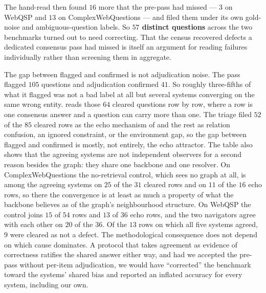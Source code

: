 The hand-read then found $16$ more that the pre-pass had missed --- $3$
on WebQSP and $13$ on ComplexWebQuestions --- and filed them under its
own gold-noise and ambiguous-question labels. So \textbf{$57$ distinct
questions} across the two benchmarks turned out to need correcting. That
the census recovered defects a dedicated consensus pass had missed is
itself an argument for reading failures individually rather than
screening them in aggregate.

The gap between flagged and confirmed is not adjudication noise. The
pass flagged $105$ questions and adjudication confirmed $41$. So roughly
three-fifths of what it flagged was not a bad label at all but several
systems converging on the same wrong entity.  reads
those $64$ cleared questions row by row, where a row is one consensus
answer and a question can carry more than one. The triage filed $52$ of
the $85$ cleared rows as the echo mechanism of  and the
rest as relation confusion, an ignored constraint, or the environment
gap, so the gap between flagged and confirmed is mostly, not entirely,
the echo attractor. The table also shows that the agreeing systems are
not independent observers for a second reason besides the graph: they
share one backbone and one resolver. On ComplexWebQuestions the
no-retrieval control, which sees no graph at all, is among the agreeing
systems on $25$ of the $31$ cleared rows and on $11$ of the $16$ echo
rows, so there the convergence is at least as much a property of what
the backbone believes as of the graph's neighbourhood structure. On
WebQSP the control joins $15$ of $54$ rows and $13$ of $36$ echo rows,
and the two navigators agree with each other on $20$ of the $36$. Of the
$13$ rows on which all five systems agreed, $9$ were cleared as not a
defect. The methodological consequence does not depend on which cause
dominates. A protocol that takes agreement as evidence of correctness
ratifies the shared answer either way, and had we accepted the pre-pass
without per-item adjudication, we would have ``corrected'' the benchmark
toward the systems' shared bias and reported an inflated accuracy for
every system, including our own.

